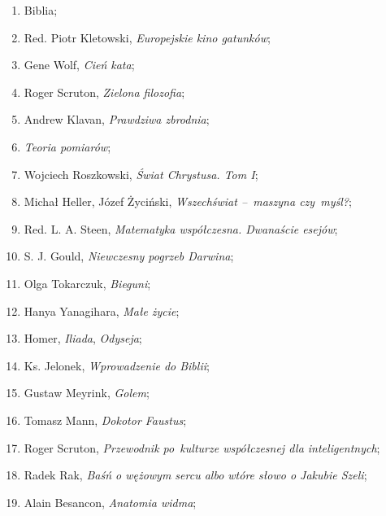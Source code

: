 \documentclass[a4paper,11pt]{article}
\begin{document}
\begin{enumerate}

\item Biblia;

\item Red. Piotr Kletowski, \textit{Europejskie kino gatunków};

\item Gene Wolf, \textit{Cień kata};

\item Roger Scruton, \textit{Zielona filozofia};

\item Andrew Klavan, \textit{Prawdziwa zbrodnia};

\item \textit{Teoria pomiarów};

\item Wojciech Roszkowski, \textit{Świat Chrystusa. Tom I};

\item Michał Heller, Józef Życiński, \textit{Wszechświat --~maszyna
    czy~myśl?};

\item Red. L. A. Steen, \textit{Matematyka współczesna. Dwanaście
    esejów};

\item S. J. Gould, \textit{Niewczesny pogrzeb Darwina};

\item Olga Tokarczuk, \textit{Bieguni};

\item Hanya Yanagihara, \textit{Małe życie};

\item Homer, \textit{Iliada}, \textit{Odyseja};

\item Ks. Jelonek, \textit{Wprowadzenie do Biblii};

\item Gustaw Meyrink, \textit{Golem};

\item Tomasz Mann, \textit{Dokotor Faustus};

\item Roger Scruton, \textit{Przewodnik po~kulturze współczesnej dla
    inteligentnych};

\item Radek Rak, \textit{Baśń o wężowym sercu albo wtóre słowo o Jakubie
    Szeli};

\item Alain Besancon, \textit{Anatomia widma};


\end{enumerate}
\end{document}
